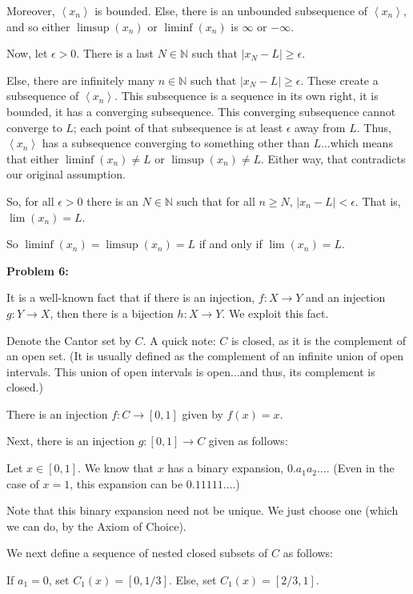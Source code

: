 \documentclass[a4paper,12pt]{article}
\newcommand{\tab}{\hspace{4mm}} %
\newcommand{\shunt}{\vspace{20mm}}
\newcommand{\absval}[1]{\lvert #1 \rvert}
\newcommand{\anbrack}[1]{\left\langle #1 \right\rangle}
\newcommand{\ep}{\epsilon}
\newcommand{\N}{\mathbb{N}}
\begin{document}
\tab Moreover, $\anbrack{x_n}$ is bounded. Else, there is an unbounded subsequence of $\anbrack{x_n}$, and so either $\limsup(x_n)$ or $\liminf(x_n)$ is $\infty$ or $-\infty$.

\tab Now, let $\ep>0$. There is a last $N \in \N$ such that $\absval{x_N - L} \geq \ep$.

\tab Else, there are infinitely many $n \in \N$ such that $\absval{x_N - L} \geq \ep$. These create a subsequence of $\anbrack{x_n}$. This subsequence is a sequence in its own right, it is bounded, it has a converging subsequence. This converging subsequence cannot converge to $L$; each point of that subsequence is at least $\ep$ away from $L$. Thus, $\anbrack{x_n}$ has a subsequence converging to something other than $L$...which means that either $\liminf(x_n) \neq L$ or $\limsup(x_n) \neq L$. Either way, that contradicts our original assumption.

\tab So, for all $\ep >0$ there is an $N \in \N$ such that for all $n \geq N$, $\absval{x_n - L} < \ep$. That is, $\lim (x_n) = L$.

So $\liminf(x_n) = \limsup(x_n) = L$ if and only if $\lim (x_n) = L$. 

\shunt

{\bf Problem 6:}

It is a well-known fact that if there is an injection, $f: X \to Y$ and an injection $g: Y \to X$, then there is a bijection $h: X \to Y$. We exploit this fact.

Denote the Cantor set by $C$. A quick note: $C$ is closed, as it is the complement of an open set. (It is usually defined as the complement of an infinite union of open intervals. This union of open intervals is open...and thus, its complement is closed.)

There is an injection $f: C \to [0,1]$ given by $f(x) = x$.

Next, there is an injection $g: [0,1] \to C$ given as follows:

\tab Let $x \in [0,1]$. We know that $x$ has a binary expansion, $0.a_1a_2 \ldots$. (Even in the case of $x=1$, this expansion can be $0.11111\ldots$.)

\tab Note that this binary expansion need not be unique. We just choose one (which we can do, by the Axiom of Choice).

\tab We next define a sequence of nested closed subsets of $C$ as follows:

\tab \tab If $a_1= 0$, set $C_1(x) = [0,1/3]$. Else, set $C_1(x) = [2/3,1]$.
\end{document}
